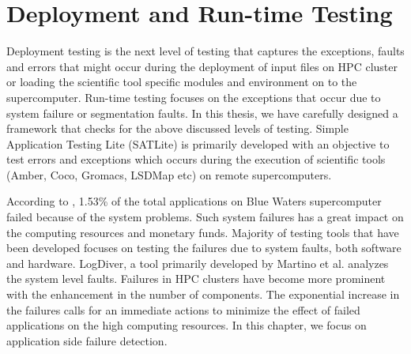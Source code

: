 \documentclass[10pt]{ruthesis}
\begin{document}

\chapter{Deployment and Run-time Testing}

Deployment testing is the next level of testing that captures the exceptions, faults and errors that might occur during the deployment of input files on HPC cluster or loading the scientific tool specific modules and environment on to the supercomputer. Run-time testing focuses on the exceptions that occur due to system failure or segmentation faults. In this thesis, we have carefully designed a framework that checks for the above discussed levels of testing. Simple Application Testing Lite (SATLite) is primarily developed with an objective to test errors and exceptions which occurs during the execution of scientific tools (Amber, Coco, Gromacs, LSDMap etc) on remote supercomputers. 

According to \cite{ref6}, 1.53\% of the total applications on Blue Waters supercomputer failed because of the system problems. Such system failures has a great impact on the computing resources and monetary funds. Majority of testing tools that have been developed focuses on testing the failures due to system faults, both software and hardware. LogDiver, a tool primarily developed by Martino et al. \cite{ref6} analyzes the system level faults. Failures in HPC clusters have become more prominent with the enhancement in the number of components. The exponential increase in the failures calls for an immediate actions to minimize the effect of failed applications on the high computing resources. In this chapter, we focus on application side failure detection. 
\end{document}
